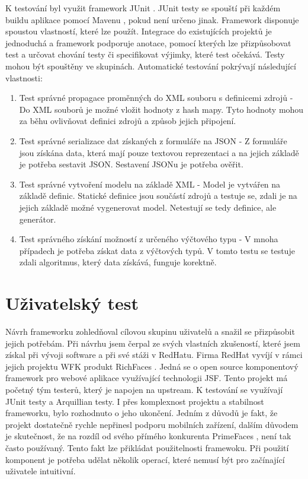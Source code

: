 K testování byl využit framework JUnit \cite{junit}. JUnit testy se spouští při každém buildu aplikace pomocí Mavenu \cite{maven}, pokud není určeno jinak. Framework disponuje spoustou vlastností, které lze použít. Integrace do existujících projektů je jednoduchá a framework podporuje anotace, pomocí kterých lze přizpůsobovat test a určovat chování testy či specifikovat výjimky, které test očekává. Testy mohou být spouštěny ve skupinách. Automatické testování pokrývají následující vlastnosti:
\begin{enumerate}
\item Test správné propagace proměnných do XML souboru s definicemi zdrojů - Do XML souborů je možné vložit hodnoty z hash mapy. Tyto hodnoty mohou za běhu ovlivňovat definici zdrojů a způsob jejich připojení. 
\item Test správné serializace dat získaných z formuláře na JSON - Z formuláře jsou získána data, která mají pouze textovou reprezentaci a na jejich základě je potřeba sestavit JSON. Sestavení JSONu je potřeba ověřit.
\item Test správné vytvoření modelu na základě XML - Model je vytvářen na základě definic. Statické definice jsou součástí zdrojů a testuje se, zdali je na jejich základě možné vygenerovat model. Netestují se tedy definice, ale generátor.
\item Test správného získání možností z určeného výčtového typu - V mnoha případech je potřeba získat data z výčtových typů. V tomto testu se testuje zdali algoritmus, který data získává, funguje korektně.
\end{enumerate}

\section{Uživatelský test}
Návrh frameworku zohledňoval cílovou skupinu uživatelů a snažil se přizpůsobit jejich potřebám. Při návrhu jsem čerpal ze svých vlastních zkušeností, které jsem získal při vývoji software a při své stáži v RedHatu. Firma RedHat vyvíjí v rámci jejich projektu WFK produkt RichFaces \cite{richfaces}. Jedná se o open source komponentový framework pro webové aplikace využívající technologii JSF. Tento projekt má početný tým testerů, který je napojen na upstream. K testování se využívají JUnit testy a Arquillian testy. I přes komplexnost projektu a stabilnost frameworku, bylo rozhodnuto o jeho ukončení. Jedním z důvodů je fakt, že projekt dostatečně rychle nepřinesl podporu mobilních zařízení, dalším důvodem je skutečnost, že na rozdíl od svého přímého konkurenta PrimeFaces \cite{primefaces}, není tak často používaný. Tento fakt lze přikládat použitelnosti framewoku. Při použití komponent je potřeba udělat několik operací, které nemusí být pro začínající uživatele intuitivní. 

